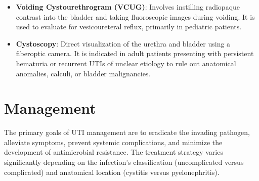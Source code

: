 \begin{itemize}
\begin{itemize}
        \item \textbf{Voiding Cystourethrogram (VCUG)}: Involves instilling radiopaque contrast into the bladder and taking fluoroscopic images during voiding. It is used to evaluate for vesicoureteral reflux, primarily in pediatric patients.
        \item \textbf{Cystoscopy}: Direct visualization of the urethra and bladder using a fiberoptic camera. It is indicated in adult patients presenting with persistent hematuria or recurrent UTIs of unclear etiology to rule out anatomical anomalies, calculi, or bladder malignancies.
    \end{itemize}
\end{itemize}

\section*{Management}
The primary goals of UTI management are to eradicate the invading pathogen, alleviate symptoms, prevent systemic complications, and minimize the development of antimicrobial resistance. The treatment strategy varies significantly depending on the infection's classification (uncomplicated versus complicated) and anatomical location (cystitis versus pyelonephritis).

